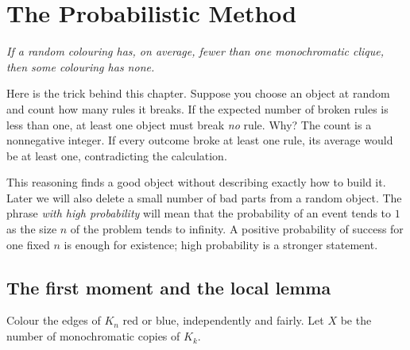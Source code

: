 \chapter{The Probabilistic Method}

\begin{center}\itshape
If a random colouring has, on average, fewer than one monochromatic clique,\\
then some colouring has none.
\end{center}

Here is the trick behind this chapter. Suppose you choose an object at random and count how many rules it breaks. If the expected number of broken rules is less than one, at least one object must break \emph{no} rule. Why? The count is a nonnegative integer. If every outcome broke at least one rule, its average would be at least one, contradicting the calculation.

This reasoning finds a good object without describing exactly how to build it. Later we will also delete a small number of bad parts from a random object. The phrase \emph{with high probability} will mean that the probability of an event tends to $1$ as the size $n$ of the problem tends to infinity. A positive probability of success for one fixed $n$ is enough for existence; high probability is a stronger statement.

\section{The first moment and the local lemma}

Colour the edges of $K_n$ red or blue, independently and fairly. Let $X$ be the number of monochromatic copies of $K_k$.

